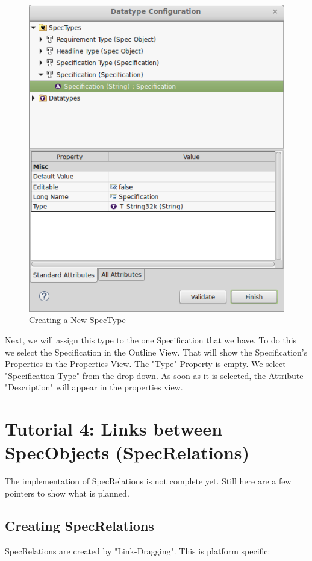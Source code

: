\begin{figure}[h!]
\centering      
\includegraphics[width=0.8\linewidth]{../rmf-images/new_spectype.png}      
\caption{Creating a New SpecType}      
\label{fig:newSpecType}
\end{figure}

Next, we will assign this type to the one Specification that we have.  To
do this we select the Specification in the Outline View.  That will show
the Specification's Properties in the Properties View.  The "Type"
Property is empty.  We select "Specification Type" from the drop down.
As soon as it is selected, the Attribute "Description" will appear in
the properties view.

\section{Tutorial 4: Links between SpecObjects (SpecRelations)}

The implementation of SpecRelations is not complete yet.  Still here are
a few pointers to show what is planned.

\subsection{Creating SpecRelations}

SpecRelations are created by "Link-Dragging".  This is platform
specific:

